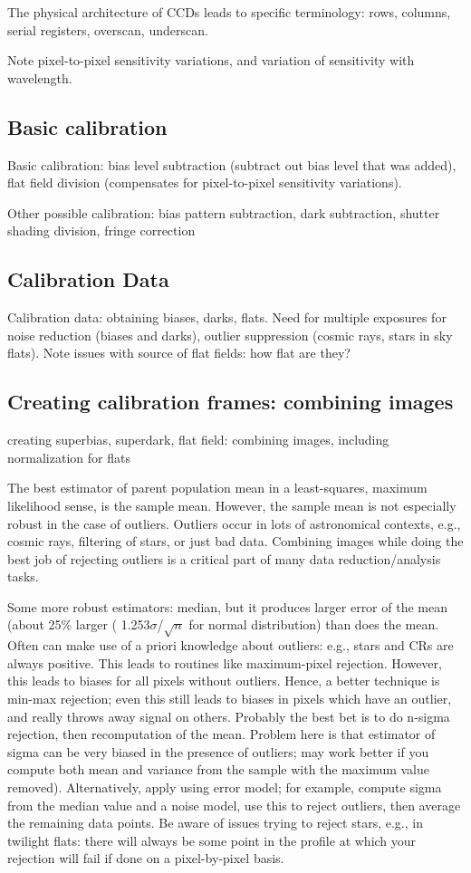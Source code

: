 \documentclass{article}
\begin{document}
The physical architecture of CCDs leads to specific terminology: rows,
columns, serial registers, overscan, underscan.

Note pixel-to-pixel sensitivity variations, and variation of
sensitivity with wavelength.

\subsection*{Basic calibration}
Basic calibration: bias level subtraction (subtract out bias level
that was added), flat field division (compensates for pixel-to-pixel
sensitivity variations).

Other possible calibration: bias pattern subtraction, dark
subtraction, shutter shading division, fringe correction

\subsection*{Calibration Data}
Calibration data: obtaining biases, darks, flats. Need for multiple
exposures for noise reduction (biases and darks), outlier suppression
(cosmic rays, stars in sky flats). Note issues with source of flat
fields: how flat are they?

\subsection*{Creating calibration frames: combining images}
creating superbias, superdark, flat field: combining images, including
normalization for flats

The best estimator of parent population mean in a least-squares,
maximum likelihood sense, is the sample mean. However, the sample mean
is not especially robust in the case of outliers. Outliers occur in
lots of astronomical contexts, e.g., cosmic rays, filtering of stars,
or just bad data. Combining images while doing the best job of
rejecting outliers is a critical part of many data reduction/analysis
tasks.

Some more robust estimators: median, but it produces larger error of
the mean (about 25\% larger ( 1.253$\sigma$/$\sqrt{n}$ for normal
distribution) than does the mean. Often can make use of a priori
knowledge about outliers: e.g., stars and CRs are always positive.
This leads to routines like maximum-pixel rejection. However, this
leads to biases for all pixels without outliers. Hence, a better
technique is min-max rejection; even this still leads to biases in
pixels which have an outlier, and really throws away signal on others.
Probably the best bet is to do n-sigma rejection, then recomputation
of the mean. Problem here is that estimator of sigma can be very
biased in the presence of outliers; may work better if you compute
both mean and variance from the sample with the maximum value
removed). Alternatively, apply using error model; for example, compute
sigma from the median value and a noise model, use this to reject
outliers, then average the remaining data points. Be aware of issues
trying to reject stars, e.g., in twilight flats: there will always be
some point in the profile at which your rejection will fail if done on
a pixel-by-pixel basis.
\end{document}
